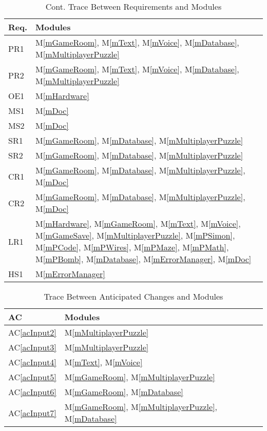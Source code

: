 \documentclass[12pt, titlepage]{article}
\newcommand{\acref}[1]{AC\ref{#1}}
\newcommand{\mref}[1]{M\ref{#1}}
\begin{document}
\begin{table}[H]
\centering
\begin{tabular}{p{} p{}}
\toprule
\textbf{Req.} & \textbf{Modules}\\
\midrule
PR1 & \mref{mGameRoom}, \mref{mText}, \mref{mVoice}, \mref{mDatabase}, \mref{mMultiplayerPuzzle}\\
PR2 & \mref{mGameRoom}, \mref{mText}, \mref{mVoice}, \mref{mDatabase}, \mref{mMultiplayerPuzzle}\\
OE1     & \mref{mHardware}\\
MS1& \mref{mDoc}\\
MS2& \mref{mDoc}\\
SR1 & \mref{mGameRoom}, \mref{mDatabase}, \mref{mMultiplayerPuzzle}\\
SR2 & \mref{mGameRoom}, \mref{mDatabase}, \mref{mMultiplayerPuzzle}\\
CR1 & \mref{mGameRoom}, \mref{mDatabase}, \mref{mMultiplayerPuzzle}, \mref{mDoc}\\
CR2 & \mref{mGameRoom}, \mref{mDatabase}, \mref{mMultiplayerPuzzle}, \mref{mDoc}\\
LR1     & \mref{mHardware}, \mref{mGameRoom}, \mref{mText}, \mref{mVoice}, \mref{mGameSave}, \mref{mMultiplayerPuzzle}, \mref{mPSimon}, \mref{mPCode}, \mref{mPWires}, \mref{mPMaze}, \mref{mPMath}, \mref{mPBomb}, \mref{mDatabase}, \mref{mErrorManager}, \mref{mDoc}\\
HS1     & \mref{mErrorManager}\\
\bottomrule
\end{tabular}
\caption{Cont. Trace Between Requirements and Modules}
\label{TblRT2}
\end{table}

\begin{table}[H]
\centering
\begin{tabular}{p{} p{}}
\toprule
\textbf{AC} & \textbf{Modules}\\
\midrule
\acref{acInput2} & \mref{mMultiplayerPuzzle}\\
\acref{acInput3} & \mref{mMultiplayerPuzzle}\\
\acref{acInput4} & \mref{mText}, \mref{mVoice}\\
\acref{acInput5} & \mref{mGameRoom}, \mref{mMultiplayerPuzzle}\\
\acref{acInput6} & \mref{mGameRoom}, \mref{mDatabase}\\
\acref{acInput7} & \mref{mGameRoom}, \mref{mMultiplayerPuzzle}, \mref{mDatabase}\\
\bottomrule
\end{tabular}
\caption{Trace Between Anticipated Changes and Modules}
\label{TblACT}
\end{table}
\end{document}
